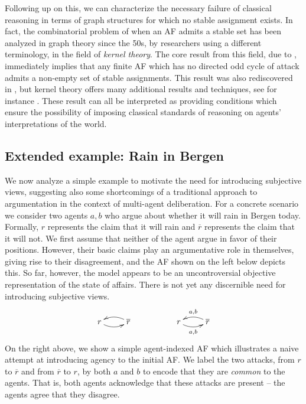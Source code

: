 \documentclass[greybox]{svmult}
\renewcommand{\bar}[1]{\overline{#1}}
\begin{document}
Following up on this, we can characterize the necessary failure of classical reasoning in terms of graph structures for which no stable assignment exists. In fact, the combinatorial problem of when an AF admits a stable set has been analyzed in graph theory since the 50s, by researchers using a different terminology, in the field of \emph{kernel theory}. The core result from this field, due to \cite{richardson}, immediately implies that any finite AF which has no directed odd cycle of attack admits a non-empty set of stable assignments. This result was also rediscovered in \cite{dung}, but kernel theory offers many additional results and techniques, see for instance \cite{sanches}. These result can all be interpreted as providing conditions which ensure the possibility of imposing classical standards of reasoning on agents' interpretations of the world.

\subsection{Extended example: Rain in Bergen}\label{ex:run}

We now analyze a simple example to motivate the need for introducing subjective views, suggesting also some shortcomings of a traditional approach to argumentation in the context of multi-agent deliberation. For a concrete scenario we consider two agents $a,b$ who argue about whether it will rain in Bergen today. Formally, $r$ represents the claim that it will rain and $\overline r$ represents the claim that it will not. We first assume that neither of the agent argue in favor of their positions. However, their basic claims play an argumentative role in themselves, giving rise to their disagreement, and the AF shown on the left below depicts this. So far, however, the model appears to be an uncontroversial objective representation of the state of affairs. There is not yet any discernible need for introducing subjective views. 
$$
\begin{array}{ccc}
\xymatrix{ r \ar@/_/[r] & \overline r \ar@/_/[l] } & \hspace{3em} &
\xymatrix{ r \ar@/_/[r]_{{ a},{ b}} & \bar r \ar@/_/[l]_{{ a},{ b}} }
\end{array}
$$
On the right above, we show a simple agent-indexed AF which illustrates a naive attempt at introducing agency to the initial AF. We label the two attacks, from $r$ to $\overline r$ and from $\overline r$ to $r$, by both $a$ and $b$ to encode that they are \emph{common} to the agents. That is, both agents acknowledge that these attacks are present -- the agents agree that they disagree.
\end{document}
